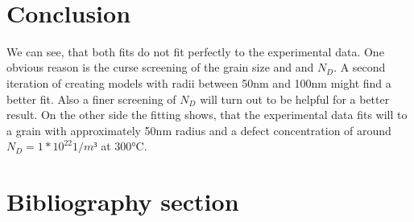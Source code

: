 \documentclass[11pt]{article}
\begin{document}
    \begin{center}
    \end{center}
    { \hspace*{\fill} \\}
    
    \hypertarget{conclusion}{%
\section{Conclusion}\label{conclusion}}

We can see, that both fits do not fit perfectly to the experimental
data. One obvious reason is the curse screening of the grain size and
and \(N_D\). A second iteration of creating models with radii between
50nm and 100nm might find a better fit. Also a finer screening of
\(N_D\) will turn out to be helpful for a better result. On the other
side the fitting shows, that the experimental data fits will to a grain
with approximately 50nm radius and a defect concentration of around
\(N_D=1*10^{22} 1/m³\) at 300°C.

    \hypertarget{bibliography-section}{%
\section{Bibliography section}\label{bibliography-section}}

    



    
    
    
\end{document}
